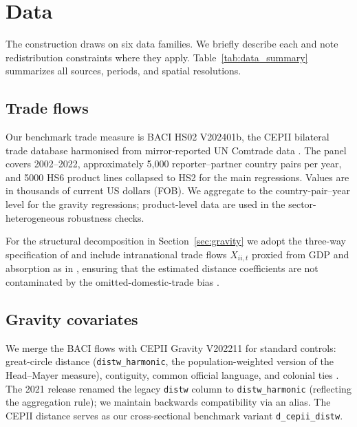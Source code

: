 \documentclass[11pt, a4paper]{article}
\begin{document}
\section{Data}
\label{sec:data}

The construction draws on six data families. We briefly describe each and note
redistribution constraints where they apply.  Table~\ref{tab:data_summary}
summarizes all sources, periods, and spatial resolutions.

\subsection{Trade flows}
\label{sec:data:trade}

Our benchmark trade measure is BACI HS02 V202401b, the CEPII bilateral trade
database harmonised from mirror-reported UN Comtrade data
\citep{gaulier_zignago_2010}. The panel covers 2002--2022, approximately 5{,}000
reporter--partner country pairs per year, and \num[group-separator={,}]{5000}
HS6 product lines collapsed to HS2 for the main regressions. Values are in
thousands of current US dollars (FOB). We aggregate to the
country-pair--year level for the gravity regressions; product-level data
are used in the sector-heterogeneous robustness checks.

For the structural decomposition in Section~\ref{sec:gravity} we adopt the
three-way specification of \citet{yotov_piermartini_monteiro_larch_2016} and
include intranational trade flows $X_{ii,t}$ proxied from GDP and absorption as
in \citet{heid_larch_yotov_2021}, ensuring that the estimated distance
coefficients are not contaminated by the omitted-domestic-trade bias
\citep{anderson_vanwincoop_2003}.

\subsection{Gravity covariates}
\label{sec:data:cepii}

We merge the BACI flows with CEPII Gravity V202211 for standard controls:
great-circle distance (\texttt{distw\_harmonic}, the population-weighted
version of the Head--Mayer measure), contiguity, common official language, and
colonial ties \citep{mayer_zignago_2011}. The 2021 release renamed the legacy
\texttt{distw} column to \texttt{distw\_harmonic} (reflecting the aggregation
rule); we maintain backwards compatibility via an alias.  The CEPII
distance serves as our cross-sectional benchmark variant \texttt{d\_cepii\_distw}.
\end{document}
